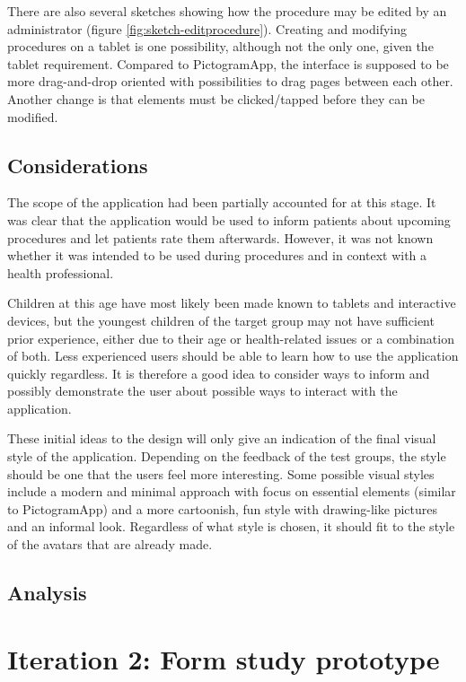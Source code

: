There are also several sketches showing how the procedure may be edited by an administrator (figure \ref{fig:sketch-editprocedure}). Creating and modifying procedures on a tablet is one possibility, although not the only one, given the tablet requirement. Compared to PictogramApp, the interface is supposed to be more drag-and-drop oriented with possibilities to drag pages between each other. Another change is that elements must be clicked/tapped before they can be modified.

\subsection{Considerations}

The scope of the application had been partially accounted for at this stage. It was clear that the application would be used to inform patients about upcoming procedures and let patients rate them afterwards. However, it was not known whether it was intended to be used during procedures and in context with a health professional.

Children at this age have most likely been made known to tablets and interactive devices, but the youngest children of the target group may not have sufficient prior experience, either due to their age or health-related issues or a combination of both. Less experienced users should be able to learn how to use the application quickly regardless. It is therefore a good idea to consider ways to inform and possibly demonstrate the user about possible ways to interact with the application.

These initial ideas to the design will only give an indication of the final visual style of the application. Depending on the feedback of the test groups, the style should be one that the users feel more interesting. Some possible visual styles include a modern and minimal approach with focus on essential elements (similar to PictogramApp) and a more cartoonish, fun style with drawing-like pictures and an informal look. Regardless of what style is chosen, it should fit to the style of the avatars that are already made.

\subsection{Analysis}

\section{Iteration 2: Form study prototype}
\label{sec:iteration2}


